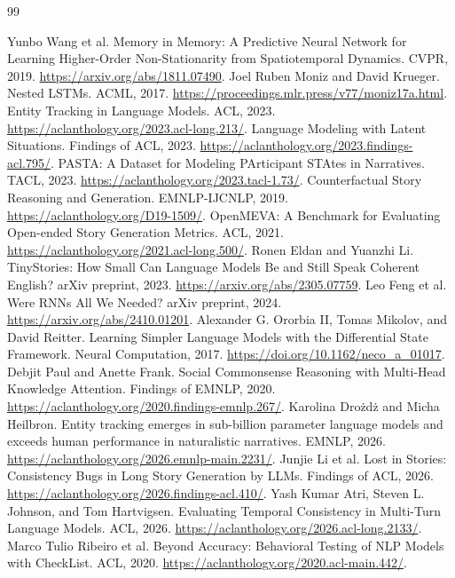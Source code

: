 \begin{thebibliography}{99}
\raggedright
{} Yunbo Wang et al. Memory in Memory: A Predictive Neural Network for
Learning Higher-Order Non-Stationarity from Spatiotemporal Dynamics. CVPR, 2019.
\url{https://arxiv.org/abs/1811.07490}.
 Joel Ruben Moniz and David Krueger. Nested LSTMs. ACML, 2017.
\url{https://proceedings.mlr.press/v77/moniz17a.html}.
 Entity Tracking in Language Models. ACL, 2023.
\url{https://aclanthology.org/2023.acl-long.213/}.
 Language Modeling with Latent Situations. Findings of ACL, 2023.
\url{https://aclanthology.org/2023.findings-acl.795/}.
 PASTA: A Dataset for Modeling PArticipant STAtes in Narratives.
TACL, 2023. \url{https://aclanthology.org/2023.tacl-1.73/}.
 Counterfactual Story Reasoning and Generation. EMNLP-IJCNLP, 2019.
\url{https://aclanthology.org/D19-1509/}.
 OpenMEVA: A Benchmark for Evaluating Open-ended Story Generation
Metrics. ACL, 2021. \url{https://aclanthology.org/2021.acl-long.500/}.
 Ronen Eldan and Yuanzhi Li. TinyStories: How Small Can Language Models
Be and Still Speak Coherent English? arXiv preprint, 2023.
\url{https://arxiv.org/abs/2305.07759}.
 Leo Feng et al. Were RNNs All We Needed? arXiv preprint, 2024.
\url{https://arxiv.org/abs/2410.01201}.
 Alexander G. Ororbia II, Tomas Mikolov, and David Reitter.
Learning Simpler Language Models with the Differential State Framework.
Neural Computation, 2017.
\url{https://doi.org/10.1162/neco_a_01017}.
 Debjit Paul and Anette Frank. Social Commonsense Reasoning with
Multi-Head Knowledge Attention. Findings of EMNLP, 2020.
\url{https://aclanthology.org/2020.findings-emnlp.267/}.
 Karolina Dro\.zd\.z and Micha Heilbron. Entity tracking
emerges in sub-billion parameter language models and exceeds human performance
in naturalistic narratives. EMNLP, 2026.
\url{https://aclanthology.org/2026.emnlp-main.2231/}.
 Junjie Li et al. Lost in Stories: Consistency Bugs in Long
Story Generation by LLMs. Findings of ACL, 2026.
\url{https://aclanthology.org/2026.findings-acl.410/}.
 Yash Kumar Atri, Steven L. Johnson, and Tom Hartvigsen.
Evaluating Temporal Consistency in Multi-Turn Language Models. ACL, 2026.
\url{https://aclanthology.org/2026.acl-long.2133/}.
 Marco Tulio Ribeiro et al. Beyond Accuracy: Behavioral
Testing of NLP Models with CheckList. ACL, 2020.
\url{https://aclanthology.org/2020.acl-main.442/}.

\end{thebibliography}
